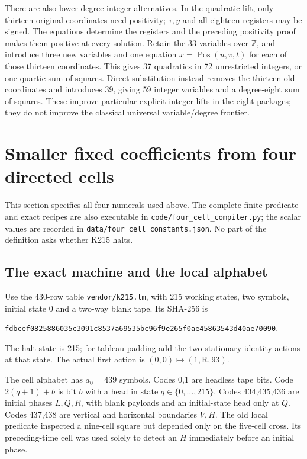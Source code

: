 \documentclass[11pt,a4paper]{article}
\theoremstyle{remark}\newtheorem{remark}[theorem]{Remark}
\newcommand{\Z}{\mathbb Z}
\newcommand{\file}[1]{\nolinkurl{#1}}
\begin{document}
There are also lower-degree integer alternatives. In the quadratic lift,
only thirteen original coordinates need positivity; \(\tau,y\) and
all eighteen registers may be signed. The equations determine the
registers and the preceding positivity proof makes them positive at
every solution. Retain the 33 variables over \(\Z\), and introduce
three new variables and one equation \(x=\operatorname{Pos}(u,v,t)\)
for each of those thirteen coordinates. This gives 37 quadratics in
72 unrestricted integers, or one quartic sum of squares. Direct
substitution instead removes the thirteen old coordinates and introduces
39, giving 59 integer variables and a degree-eight sum of squares.
These improve particular explicit integer lifts in the eight packages;
they do not improve the classical universal variable/degree frontier.

\section{Smaller fixed coefficients from four directed cells}\label{sec:coefficients}
This section specifies all four numerals used above. The complete finite
predicate and exact recipes are also executable in
\file{code/four_cell_compiler.py}; the scalar values are recorded in
\file{data/four_cell_constants.json}. No part of the definition asks
whether K215 halts.

\subsection{The exact machine and the local alphabet}
Use the 430-row table \file{vendor/k215.tm}, with 215 working states,
two symbols, initial state 0 and a two-way blank tape. Its SHA-256 is
\begin{center}\small
\texttt{fdbcef0825886035c3091c8537a69535bc96f9e265f0ae45863543d40ae70090}.
\end{center}
The halt state is 215; for tableau padding add the two stationary
identity actions at that state. The actual first action is
\((0,0)\mapsto(1,\mathrm R,93)\).

The cell alphabet has \(a_0=439\) symbols. Codes 0,1 are headless
tape bits. Code \(2(q+1)+b\) is bit \(b\) with a head in state
\(q\in\{0,\ldots,215\}\). Codes 434,435,436 are initial phases
\(L,Q,R\), with blank payloads and an initial-state head only at
\(Q\). Codes 437,438 are vertical and horizontal boundaries \(V,H\).
The old local predicate inspected a nine-cell square but depended only
on the five-cell cross. Its preceding-time cell was used solely to
detect an \(H\) immediately before an initial phase.
\end{document}
